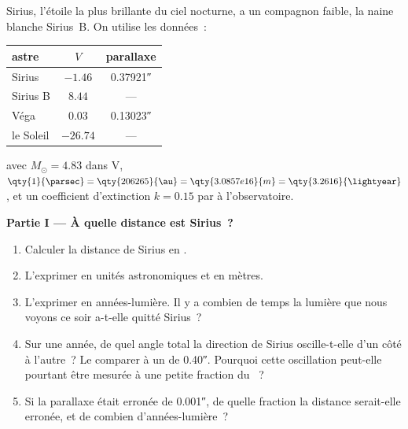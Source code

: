 \begin{problem}
\label{pb:b1:observing-the-sky:1}
Sirius, l'étoile la plus brillante du ciel nocturne, a un compagnon faible, la
naine blanche Sirius~B. On utilise les données~:
\begin{center}
\small
\begin{tabular}{lcc}
\hline
astre & $V$ & parallaxe \\
\hline
Sirius & $-1.46$ & \ang{;;0.37921} \\
Sirius B & $8.44$ & --- \\
Véga & $0.03$ & \ang{;;0.13023} \\
le Soleil & $-26.74$ & --- \\
\hline
\end{tabular}
\end{center}
avec $M_\odot = 4.83$ dans V, $\qty{1}{\parsec} = \qty{206265}{\au} =
\qty{3.0857e16}{m} = \qty{3.2616}{\lightyear}$, et un coefficient d'extinction
$k = 0.15$ par  à l'observatoire.

\medskip
\noindent\textbf{Partie I --- À quelle distance est Sirius~?}
\begin{enumerate}
  \item Calculer la distance de Sirius en .
  \item L'exprimer en unités astronomiques et en mètres.
  \item L'exprimer en années-lumière. Il y a combien de temps la lumière que
        nous voyons ce soir a-t-elle quitté Sirius~?
  \item Sur une année, de quel angle total la direction de Sirius oscille-t-elle
        d'un côté à l'autre~? Le comparer à un  de \ang{;;0.40}.
        Pourquoi cette oscillation peut-elle pourtant être mesurée à une petite
        fraction du ~?
  \item Si la parallaxe était erronée de \ang{;;0.001}, de quelle fraction la
        distance serait-elle erronée, et de combien d'années-lumière~?
\end{enumerate}


\end{problem}
